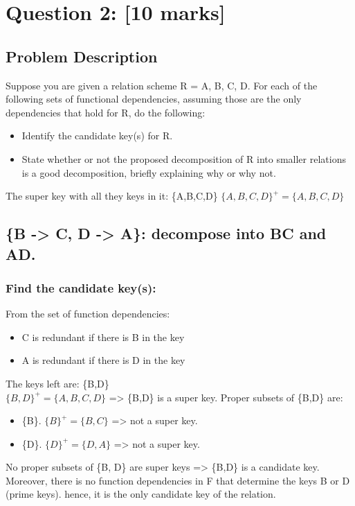 \newpage
\section{Question 2: [10 marks]}
\subsection{Problem Description}
Suppose you are given a relation scheme R = {A, B, C, D}. For each of the following sets
of functional dependencies, assuming those are the only dependencies that hold for R, do
the following:
\begin{itemize}
    \item Identify the candidate key(s) for R.
    \item State whether or not the proposed decomposition of R into smaller relations
is a good decomposition, briefly explaining why or why not.
\end{itemize}

The super key with all they keys in it: \{A,B,C,D\}
$\{A,B,C,D\}^{+} = \{A,B,C,D\}$


\newpage
\subsection{\{B -> C, D -> A\}: decompose into BC and AD.}
\subsubsection{Find the candidate key(s):}
From the set of function dependencies:
\begin{itemize}
    \item C is redundant if there is B in the key
    \item A is redundant if there is D in the key
\end{itemize}
The keys left are: \{B,D\} \\
$\{B,D\}^{+} = \{A,B,C,D\}$ => \{B,D\} is a super key.
Proper subsets of \{B,D\} are:
\begin{itemize}
    \item \{B\}. $\{B\}^{+} = \{B, C\}$ => not a super key.
    \item \{D\}. $\{D\}^{+} = \{D, A\}$ => not a super key.
\end{itemize}
No proper subsets of \{B, D\} are super keys => \{B,D\} is a candidate key.
Moreover, there is no function dependencies in F that determine the keys B or D (prime keys). hence, it is the only candidate key of the relation.

